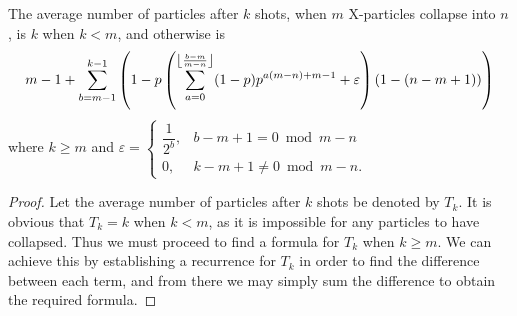 \begin{theorem}
  The average number of particles after $k$ shots, when $m$ X-particles collapse into $n$, is $k$ when $k < m$, and otherwise is 
  \begin{equation}
    m-1+\sum _{b=m-1}^{k-1} \left(1-p \left(\sum _{a=0}^{\floor*{\frac{b-m}{m-n}} } (1-p) p^{a (m-n)+m-1}+\varepsilon\right) (1-(n-m+1))\right) \label{formula}
  \end{equation}
  where $k \ge m$ and $\varepsilon = \begin{cases} \dfrac{1}{2^b}, &b-m+1 = 0 \bmod m-n \\ 0, &k-m+1 \neq 0 \bmod m-n. \end{cases}$
\end{theorem}
\begin{proof}
  Let the average number of particles after $k$ shots be denoted by $T_k$. It is obvious that $T_k = k$ when $k < m$, as it is impossible for any particles to have collapsed. Thus we must proceed to find a formula for $T_k$ when $k \ge m$. We can achieve this by establishing a recurrence for $T_k$ in order to find the difference between each term, and from there we may simply sum the difference to obtain the required formula. 


\end{proof}
